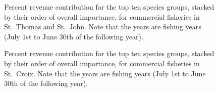 \documentclass[
  letterpaper,
  oneside,
  open=any]{scrbook}
\begin{document}
\begin{figure}


\caption{\label{fig-perlandSTT}Percent revenue contribution for the top
ten species groups, stacked by their order of overall importance, for
commercial fisheries in St.~Thomas and St.~John. Note that the years are
fishing years (July 1st to June 30th of the following year).}

\end{figure}%

\begin{figure}


\caption{\label{fig-perlandSTX}Percent revenue contribution for the top
ten species groups, stacked by their order of overall importance, for
commercial fisheries in St.~Croix. Note that the years are fishing years
(July 1st to June 30th of the following year).}

\end{figure}%
\end{document}
